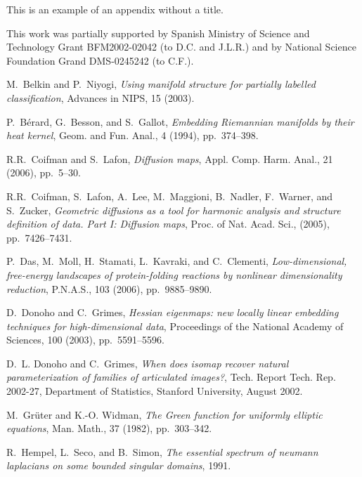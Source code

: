 \documentclass{pnastwo}
\begin{document}
\begin{article}
\appendix
This is an example of an appendix without a title.

\begin{acknowledgments}
This work was partially supported by 
Spanish Ministry of Science and Technology Grant BFM2002-02042 (to D.C. and
J.L.R.) and by National Science Foundation Grand DMS-0245242 (to C.F.).
\end{acknowledgments}



\begin{thebibliography}{10}
M.~Belkin and P.~Niyogi, {\em Using manifold structure for partially
  labelled classification}, Advances in NIPS, 15 (2003).

P.~B\'erard, G.~Besson, and S.~Gallot, {\em Embedding {R}iemannian
  manifolds by their heat kernel}, Geom. and Fun. Anal., 4 (1994),
  pp.~374--398.

R.R.~Coifman and S.~Lafon, {\em Diffusion maps}, Appl. Comp. Harm. Anal.,
  21 (2006), pp.~5--30.

R.R.~Coifman, S.~Lafon, A.~Lee, M.~Maggioni, B.~Nadler, F.~Warner, and
  S.~Zucker, {\em Geometric diffusions as a tool for harmonic analysis and
  structure definition of data. {P}art {I}: Diffusion maps}, Proc. of Nat.
  Acad. Sci.,  (2005), pp.~7426--7431.

P.~Das, M.~Moll, H.~Stamati, L.~Kavraki, and C.~Clementi, {\em
  Low-dimensional, free-energy landscapes of protein-folding reactions by
  nonlinear dimensionality reduction}, P.N.A.S., 103 (2006), pp.~9885--9890.

D.~Donoho and C.~Grimes, {\em Hessian eigenmaps: new locally linear
  embedding techniques for high-dimensional data}, Proceedings of the National
  Academy of Sciences, 100 (2003), pp.~5591--5596.

D.~L. Donoho and C.~Grimes, {\em When does isomap recover natural
  parameterization of families of articulated images?}, Tech. Report Tech. Rep.
  2002-27, Department of Statistics, Stanford University, August 2002.

M.~Gr\"uter and K.-O. Widman, {\em The {G}reen function for uniformly
  elliptic equations}, Man. Math., 37 (1982), pp.~303--342.

R.~Hempel, L.~Seco, and B.~Simon, {\em The essential spectrum of neumann
  laplacians on some bounded singular domains}, 1991.


\end{thebibliography}
\end{article}
\end{document}

